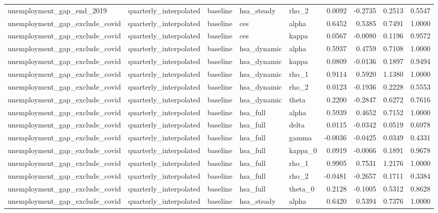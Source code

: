 \begin{tabular}{lllllrrrr}
unemployment\_gap\_end\_2019 & quarterly\_interpolated & baseline & hsa\_steady & rho\_2 & 0.0092 & -0.2735 & 0.2513 & 0.5547 \\
unemployment\_gap\_exclude\_covid & quarterly\_interpolated & baseline & ces & alpha & 0.6452 & 0.5385 & 0.7491 & 1.0000 \\
unemployment\_gap\_exclude\_covid & quarterly\_interpolated & baseline & ces & kappa & 0.0567 & -0.0080 & 0.1196 & 0.9572 \\
unemployment\_gap\_exclude\_covid & quarterly\_interpolated & baseline & hsa\_dynamic & alpha & 0.5937 & 0.4759 & 0.7108 & 1.0000 \\
unemployment\_gap\_exclude\_covid & quarterly\_interpolated & baseline & hsa\_dynamic & kappa & 0.0809 & -0.0136 & 0.1897 & 0.9494 \\
unemployment\_gap\_exclude\_covid & quarterly\_interpolated & baseline & hsa\_dynamic & rho\_1 & 0.9114 & 0.5920 & 1.1380 & 1.0000 \\
unemployment\_gap\_exclude\_covid & quarterly\_interpolated & baseline & hsa\_dynamic & rho\_2 & 0.0123 & -0.1936 & 0.2228 & 0.5553 \\
unemployment\_gap\_exclude\_covid & quarterly\_interpolated & baseline & hsa\_dynamic & theta & 0.2200 & -0.2847 & 0.6272 & 0.7616 \\
unemployment\_gap\_exclude\_covid & quarterly\_interpolated & baseline & hsa\_full & alpha & 0.5939 & 0.4652 & 0.7152 & 1.0000 \\
unemployment\_gap\_exclude\_covid & quarterly\_interpolated & baseline & hsa\_full & delta & 0.0115 & -0.0342 & 0.0519 & 0.6978 \\
unemployment\_gap\_exclude\_covid & quarterly\_interpolated & baseline & hsa\_full & gamma & -0.0036 & -0.0425 & 0.0349 & 0.4331 \\
unemployment\_gap\_exclude\_covid & quarterly\_interpolated & baseline & hsa\_full & kappa\_0 & 0.0919 & -0.0066 & 0.1891 & 0.9678 \\
unemployment\_gap\_exclude\_covid & quarterly\_interpolated & baseline & hsa\_full & rho\_1 & 0.9905 & 0.7531 & 1.2176 & 1.0000 \\
unemployment\_gap\_exclude\_covid & quarterly\_interpolated & baseline & hsa\_full & rho\_2 & -0.0481 & -0.2657 & 0.1711 & 0.3384 \\
unemployment\_gap\_exclude\_covid & quarterly\_interpolated & baseline & hsa\_full & theta\_0 & 0.2128 & -0.1005 & 0.5312 & 0.8628 \\
unemployment\_gap\_exclude\_covid & quarterly\_interpolated & baseline & hsa\_steady & alpha & 0.6420 & 0.5394 & 0.7376 & 1.0000 \\

\end{tabular}
